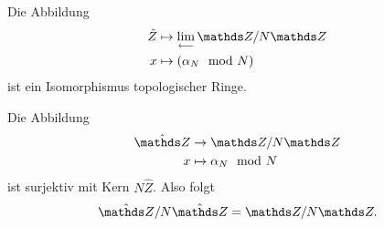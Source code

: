 \begin{thm}
Die Abbildung
\begin{align*}
\hat{Z}&\mapsto \lim_{\longleftarrow} \Z /N \Z\\
x&\mapsto (\alpha_N \mod N)
\end{align*}
ist ein Isomorphismus topologischer Ringe.
\end{thm}

Die Abbildung
\begin{align*}
\hat{\Z} &\to \Z /N\Z\\
x&\mapsto \alpha_N \mod N
\end{align*}
ist surjektiv mit Kern $N\hat{Z}$. Also folgt
\begin{align*}
\hat{\Z}/N\hat{\Z}=\Z /N \Z.
\end{align*}